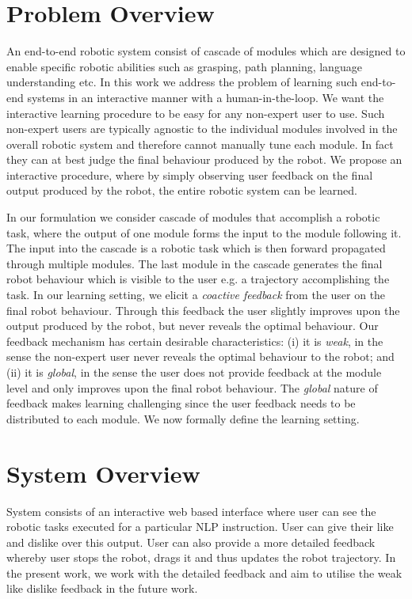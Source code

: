 \section{Problem Overview}

An end-to-end robotic system consist of cascade of modules which are designed to enable specific robotic abilities such as grasping, path planning, language understanding etc. In this
work we address the problem of learning such end-to-end systems in an interactive manner with a human-in-the-loop. We want the interactive learning procedure to be easy for any non-expert user to use. Such non-expert users are typically agnostic to the individual modules involved in the overall robotic system and therefore cannot manually tune each module. In fact they can at best judge the final behaviour produced by the robot. We propose an interactive procedure, where by simply observing user feedback on the final output produced by the robot, the entire robotic system can be learned.

In our formulation we consider cascade of modules that accomplish a robotic task, where the output of one module forms the input to the module following it. The input into the cascade is a robotic task which is then forward propagated through multiple modules. The last module in the cascade generates the final robot behaviour which is visible to the user e.g. a trajectory accomplishing the task. In our learning setting, we elicit a \textit{coactive feedback} from the user on the final robot behaviour. Through this feedback the user slightly improves upon the output produced by the robot, but never reveals the optimal behaviour. Our feedback mechanism has certain desirable characteristics: (i) it is \textit{weak}, in the sense the non-expert user never reveals the optimal behaviour to the robot; and (ii) it is \textit{global}, in the sense the user does not provide feedback at the module level and only improves upon the final robot behaviour. The \textit{global} nature of feedback makes learning challenging since the user feedback needs to be distributed to each module. We now formally define the learning setting.

\section{System Overview}
System consists of an interactive web based interface where user can see the robotic tasks
executed for a particular NLP instruction. User can give their like and dislike
over this output. User can also provide a more detailed feedback whereby user stops the robot, drags it and thus updates the robot trajectory. In the present work, we work with the detailed feedback and aim to utilise the weak like dislike feedback in the future work.
